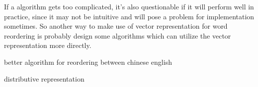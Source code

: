 If a algorithm gets too complicated, it's also questionable if it will perform well in practice, since it may not be intuitive and will pose a problem for implementation sometimes. So another way to make use of vector representation for word reordering is probably design some algorithms which can utilize the vector representation more directly.




better algorithm for reordering between chinese english

distributive representation